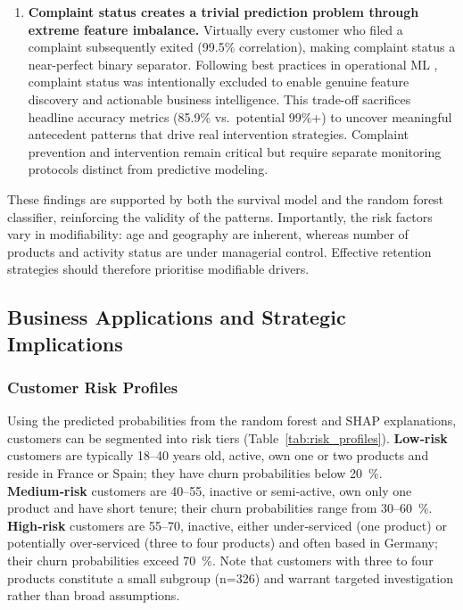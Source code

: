 \documentclass[12pt]{article}
\begin{document}
\begin{enumerate}
  \item \textbf{Complaint status creates a trivial prediction problem through extreme feature imbalance.}  Virtually every customer who filed a complaint subsequently exited (99.5\% correlation), making complaint status a near-perfect binary separator.  Following best practices in operational ML \citep{kumar2022customerretention}, complaint status was intentionally excluded to enable genuine feature discovery and actionable business intelligence.  This trade-off sacrifices headline accuracy metrics (85.9\% vs.\ potential 99\%+) to uncover meaningful antecedent patterns that drive real intervention strategies.  Complaint prevention and intervention remain critical but require separate monitoring protocols distinct from predictive modeling.
\end{enumerate}

These findings are supported by both the survival model and the random forest classifier, reinforcing the validity of the patterns.  Importantly, the risk factors vary in modifiability: age and geography are inherent, whereas number of products and activity status are under managerial control.  Effective retention strategies should therefore prioritise modifiable drivers.

\subsection{Business Applications and Strategic Implications}

\subsubsection{Customer Risk Profiles}
Using the predicted probabilities from the random forest and SHAP explanations, customers can be segmented into risk tiers (Table~\ref{tab:risk_profiles}).  \textbf{Low‑risk} customers are typically 18–40 years old, active, own one or two products and reside in France or Spain; they have churn probabilities below 20~\%.  \textbf{Medium‑risk} customers are 40–55, inactive or semi‑active, own only one product and have short tenure; their churn probabilities range from 30–60~\%.  \textbf{High‑risk} customers are 55–70, inactive, either under‑serviced (one product) or potentially over‑serviced (three to four products) and often based in Germany; their churn probabilities exceed 70~\%.  Note that customers with three to four products constitute a small subgroup (n=326) and warrant targeted investigation rather than broad assumptions.
\end{document}
